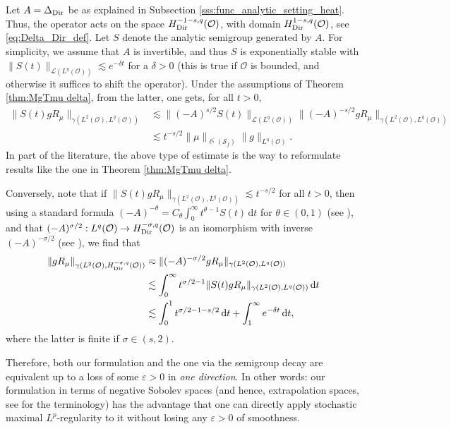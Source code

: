 \documentclass[reqno]{amsart}
\theoremstyle{plain}
\theoremstyle{remark}
\theoremstyle{plain}
\numberwithin{equation}{section}
\newcommand\cL{\mathcal{L}}
\newcommand\calL{\mathcal{L}}
\newcommand\cO{\mathcal{O}}
\newcommand{\di}{\mathrm{d}}
\newcommand{\1}{\one}
\newcommand{\Sf}{\mathcal{S}_{f}}
\begin{document}
Let $A = \Delta_{\rm Dir}$ be as explained in Subsection \ref{sss:func_analytic_setting_heat}. Thus, the operator acts on the space $H^{-1-s,q}_{\rm Dir}(\cO)$, with domain $ H^{1-s,q}_{\rm Dir}(\cO)$, see \eqref{eq:Delta_Dir_def}. Let $S$ denote the analytic semigroup generated by $A$.  For simplicity, we assume that $A$ is invertible, and thus $S$ is exponentially stable with $\|S(t)\|_{\cL(L^q(\cO))}\lesssim e^{-\delta t}$ for a $\delta >0$ (this is true if $\cO$ is bounded, and otherwise it suffices to shift the operator). Under the assumptions of Theorem \ref{thm:MgTmu delta}, from the latter, one gets, for all $t>0$,
\begin{equation}\label{eq:SgT}
\begin{aligned}
\|S(t) g  R_{\mu}\|_{\gamma(L^2(\cO),L^q(\cO))}
& \lesssim \|(-A)^{s/2}S(t)\|_{\calL(L^q(\cO))} \|(-A)^{-s/2} g  R_{\mu}\|_{\gamma(L^2(\cO),L^q(\cO))}
\\ & \lesssim t^{-s/2}\|\mu\|_{\ell^\zeta(\Sf)} \|g\|_{L^{\eta}(\cO)} .
\end{aligned}
\end{equation}
In part of the literature, the above type of estimate is the way to reformulate results like the one in Theorem \ref{thm:MgTmu delta}. 

Conversely, note that if $\|S(t) g R_{\mu}\|_{\gamma(L^2(\cO),L^q(\cO))}\lesssim t^{-s/2}$ for all $t>0$, then 
using a standard formula $(-A)^{-\theta} = C_{\theta} \int_0^\infty t^{\theta-1} S(t) \,\di t$ for $\theta\in (0,1)$ (see \cite[Lemma 6.1.5]{MarSanz}), and that $(-A)^{\sigma/2}:  L^q(\cO)\to H^{-\sigma,q}_{\rm Dir}(\cO)$ is an  isomorphism with inverse $(-A)^{-\sigma/2}$ (see \cite[Example A.4]{AV25_survey}), we find that
\begin{align*}
\|g R_{\mu}\|_{\gamma(L^2(\cO),H^{-\sigma,q}_{\rm Dir}(\cO))} &\eqsim \|(-A)^{-\sigma/2} g R_{\mu}\|_{\gamma(L^2(\cO),L^q(\cO))}
\\ & \lesssim \int_0^\infty t^{\sigma/2-1} \|S(t) g R_{\mu}\|_{\gamma(L^2(\cO),L^q(\cO))} \,\di t
\\ & \lesssim \int_0^1 t^{\sigma/2-1 -s/2}\,  \di t +\int_1^\infty e^{- \delta  t} \,\di t,
\end{align*}
where the latter is finite if $\sigma\in (s,2)$. 

Therefore, both our formulation and the one via the semigroup decay are equivalent up to a loss of some $\varepsilon>0$ in \emph{one direction}. In other words: our formulation in terms of negative Sobolev spaces (and hence, extrapolation spaces, see \cite[Appendix A]{AV25_survey} for the terminology) has the advantage that one can directly apply stochastic maximal $L^p$-regularity to it without losing any $\varepsilon>0$ of smoothness. 
\end{document}
